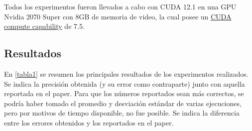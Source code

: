 \documentclass[titlepage,a4paper,oneside]{article}
\begin{document}
Todos los experimentos fueron llevados a cabo con CUDA 12.1 en una GPU Nvidia 2070 Super con 8GB de memoria de video, la cual posee un \href{https://developer.nvidia.com/cuda-gpus}{CUDA compute capability} de 7.5.

\subsection{Resultados}

En \ref{tabla1} se resumen los principales resultados de los experimentos realizados. Se indica la precisión obtenida (y su error como contraparte) junto con aquella reportada en el paper. Para que los números reportados sean más correctos, se podría haber tomado el promedio y desviación estándar de varias ejecuciones, pero por motivos de tiempo disponible, no fue posible. Se indica la diferencia entre los errores obtenidos y los reportados en el paper.
\end{document}
